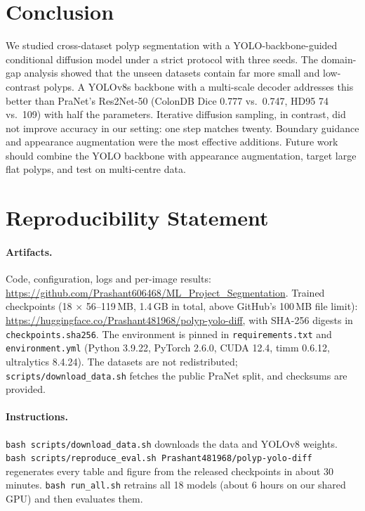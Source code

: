 \documentclass[10pt,twocolumn,letterpaper]{article}
\newcommand{\repoURL}{\url{https://github.com/Prashant606468/ML_Project_Segmentation}}
\newcommand{\hfURL}{\url{https://huggingface.co/Prashant481968/polyp-yolo-diff}}
\begin{document}
\section{Conclusion}
\label{sec:conclusion}

We studied cross-dataset polyp segmentation with a YOLO-backbone-guided conditional diffusion model under a strict protocol with three seeds. The domain-gap analysis showed that the unseen datasets contain far more small and low-contrast polyps. A YOLOv8s backbone with a multi-scale decoder addresses this better than PraNet's Res2Net-50 (ColonDB Dice 0.777 vs.\ 0.747, HD95 74 vs.\ 109) with half the parameters. Iterative diffusion sampling, in contrast, did not improve accuracy in our setting: one step matches twenty. Boundary guidance and appearance augmentation were the most effective additions. Future work should combine the YOLO backbone with appearance augmentation, target large flat polyps, and test on multi-centre data.

\section{Reproducibility Statement}
\label{sec:repro}

\paragraph{Artifacts.} Code, configuration, logs and per-image results: \repoURL. Trained checkpoints (18 $\times$ 56--119\,MB, 1.4\,GB in total, above GitHub's 100\,MB file limit): \hfURL, with SHA-256 digests in \texttt{checkpoints.sha256}. The environment is pinned in \texttt{requirements.txt} and \texttt{environment.yml} (Python 3.9.22, PyTorch 2.6.0, CUDA 12.4, timm 0.6.12, ultralytics 8.4.24). The datasets are not redistributed; \texttt{scripts/download\_data.sh} fetches the public PraNet split, and checksums are provided.

\paragraph{Instructions.} \texttt{bash scripts/download\_data.sh} downloads the data and YOLOv8 weights. \texttt{bash scripts/reproduce\_eval.sh Prashant481968/polyp-yolo-diff} regenerates every table and figure from the released checkpoints in about 30 minutes. \texttt{bash run\_all.sh} retrains all 18 models (about 6 hours on our shared GPU) and then evaluates them.
\end{document}
